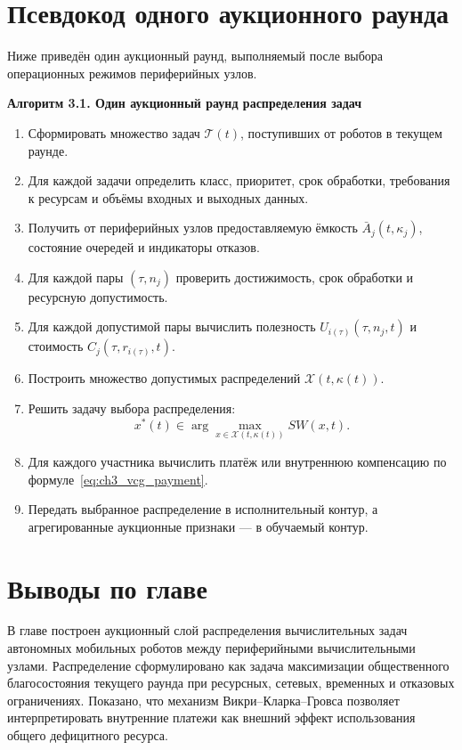 \section{Псевдокод одного аукционного раунда}

Ниже приведён один аукционный раунд, выполняемый после выбора операционных режимов периферийных узлов.

\textbf{Алгоритм 3.1. Один аукционный раунд распределения задач}
\begin{enumerate}
    \item Сформировать множество задач $\mathcal{T}(t)$, поступивших от роботов в текущем раунде.
    \item Для каждой задачи определить класс, приоритет, срок обработки, требования к ресурсам и объёмы входных и выходных данных.
    \item Получить от периферийных узлов предоставляемую ёмкость $\bar{A}_j(t,\kappa_j)$, состояние очередей и индикаторы отказов.
    \item Для каждой пары $(\tau,n_j)$ проверить достижимость, срок обработки и ресурсную допустимость.
    \item Для каждой допустимой пары вычислить полезность $U_{i(\tau)}(\tau,n_j,t)$ и стоимость $C_j(\tau,r_{i(\tau)},t)$.
    \item Построить множество допустимых распределений $\mathcal{X}(t,\kappa(t))$.
    \item Решить задачу выбора распределения:
    \[
    x^*(t)\in\arg\max_{x\in\mathcal{X}(t,\kappa(t))}SW(x,t).
    \]
    \item Для каждого участника вычислить платёж или внутреннюю компенсацию по формуле~\eqref{eq:ch3_vcg_payment}.
    \item Передать выбранное распределение в исполнительный контур, а агрегированные аукционные признаки --- в обучаемый контур.
\end{enumerate}

\section{Выводы по главе}

В главе построен аукционный слой распределения вычислительных задач автономных мобильных роботов между периферийными вычислительными узлами. Распределение сформулировано как задача максимизации общественного благосостояния текущего раунда при ресурсных, сетевых, временных и отказовых ограничениях. Показано, что механизм Викри--Кларка--Гровса позволяет интерпретировать внутренние платежи как внешний эффект использования общего дефицитного ресурса.

